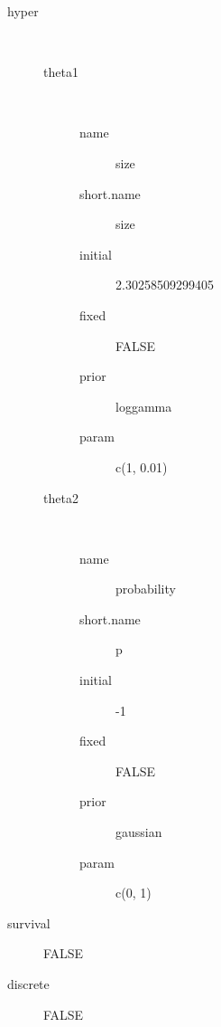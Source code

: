 \begin{description}
	\item[hyper]\ 
	 \begin{description}
	 	\item[theta1]\ 
	 	 \begin{description}
	 	 	 \item[ name ] size 
	 	 	 \item[ short.name ] size 
	 	 	 \item[ initial ] 2.30258509299405 
	 	 	 \item[ fixed ] FALSE 
	 	 	 \item[ prior ] loggamma 
	 	 	 \item[ param ] c(1, 0.01) 
	 	 \end{description}
	 	\item[theta2]\ 
	 	 \begin{description}
	 	 	 \item[ name ] probability 
	 	 	 \item[ short.name ] p 
	 	 	 \item[ initial ] -1 
	 	 	 \item[ fixed ] FALSE 
	 	 	 \item[ prior ] gaussian 
	 	 	 \item[ param ] c(0, 1) 
	 	 \end{description}
	 \end{description}
	 \item[ survival ] FALSE 
	 \item[ discrete ] FALSE 
\end{description}
